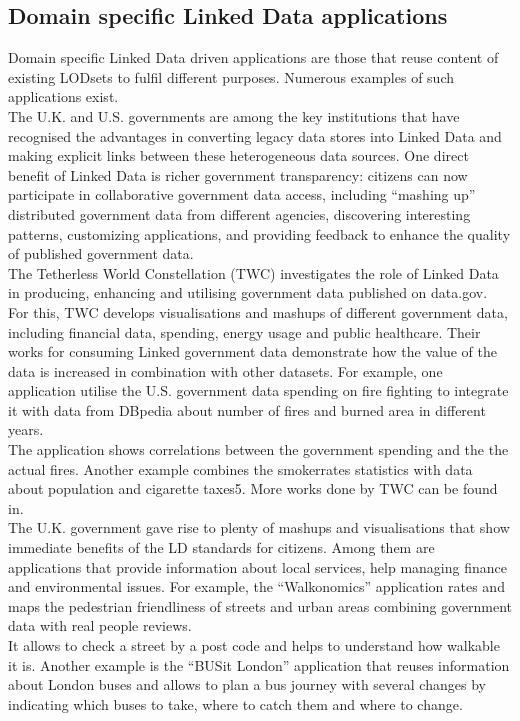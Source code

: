\documentclass[a4paper,12pt,oneside]{report}
\begin{document}
{{{\subsection{Domain specific Linked Data applications}
{Domain specific Linked Data driven applications are those that reuse content of existing LODsets to fulfil different purposes. Numerous examples of such applications exist.\\
 The U.K. and U.S. governments are among the key institutions that have recognised the advantages in converting legacy data stores into Linked Data and making explicit links between these heterogeneous data sources. One direct benefit of Linked Data is richer government transparency: citizens can now participate in collaborative government data access, including “mashing up” distributed government data from different agencies, discovering interesting patterns, customizing applications, and providing feedback to enhance the quality of published government data.\\
 The Tetherless World Constellation (TWC)  investigates the role of Linked Data in producing, enhancing and utilising government data published on data.gov. For this, TWC develops visualisations and mashups of different government data, including financial data,
spending, energy usage and public healthcare. Their works for consuming Linked government data demonstrate how the value of the data is increased in combination with other datasets. For example, one application utilise the U.S. government data spending on fire fighting to integrate it with data from DBpedia about number of fires and burned area in different years.\\
 The application shows correlations between the government spending and the the actual fires. Another example combines the smokerrates statistics with data about population and cigarette taxes5. More works done by TWC can be found in.\\
The U.K. government gave rise to plenty of mashups and visualisations that show immediate benefits of the LD standards for citizens. Among them are applications that provide information about local services, help managing finance and environmental issues. For example, the “Walkonomics” application rates and maps the pedestrian friendliness of streets and urban areas combining government data with real people reviews. \\
It allows to check a street by a post code and helps to understand how walkable it is. Another example is the “BUSit London” application that reuses information about London buses and allows to plan a bus journey with several changes by indicating which buses to take, where to catch them and where to change.\\
}}}}
\end{document}
